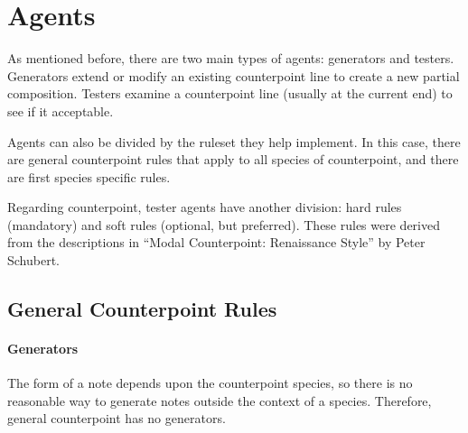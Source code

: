 \section{Agents}

As mentioned before, there are two main types of agents: generators and testers.
Generators extend or modify an existing counterpoint line to create a new partial composition.
Testers examine a counterpoint line (usually at the current end) to see if it acceptable.

%

Agents can also be divided by the ruleset they help implement. 
In this case, there are general counterpoint rules that apply to all species of counterpoint, and there are first species specific rules.

Regarding counterpoint, tester agents have another division: hard rules (mandatory) and soft rules (optional, but preferred).
These rules were derived from the descriptions in ``Modal Counterpoint: Renaissance Style'' by Peter Schubert. %

\subsection{General Counterpoint Rules}

\paragraph{Generators}
The form of a note depends upon the counterpoint species, so there is no reasonable way to generate notes outside the context of a species.
Therefore, general counterpoint has no generators.

